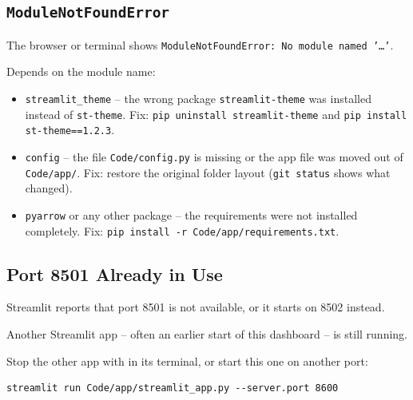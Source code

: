 \subsection{\texttt{ModuleNotFoundError}}
\label{sec:tsModule}

\begin{description}[style=nextline,leftmargin=0.5cm,font=\normalfont\bfseries]
  \item[Symptom] The browser or terminal shows \texttt{ModuleNotFoundError: No module named '\dots'}.
  \item[Cause and solution] Depends on the module name:
  \begin{itemize}
    \item \texttt{streamlit\_theme} -- the wrong package \texttt{streamlit-theme} was installed instead of \texttt{st-theme}. Fix: \texttt{pip uninstall streamlit-theme} and \texttt{pip install st-theme==1.2.3}.
    \item \texttt{config} -- the file \texttt{Code/config.py} is missing or the app file was moved out of \texttt{Code/app/}. Fix: restore the original folder layout (\texttt{git status} shows what changed).
    \item \texttt{pyarrow} or any other package -- the requirements were not installed completely. Fix: \texttt{pip install -r Code/app/requirements.txt}.
  \end{itemize}
\end{description}

\subsection{Port 8501 Already in Use}
\label{sec:tsPort}

\begin{description}[style=nextline,leftmargin=0.5cm,font=\normalfont\bfseries]
  \item[Symptom] Streamlit reports that port 8501 is not available, or it starts on 8502 instead.
  \item[Cause] Another Streamlit app -- often an earlier start of this dashboard -- is still running.
  \item[Solution] Stop the other app with  in its terminal, or start this one on another port:
\begin{lstlisting}[style=shell]
streamlit run Code/app/streamlit_app.py --server.port 8600
\end{lstlisting}
\end{description}

